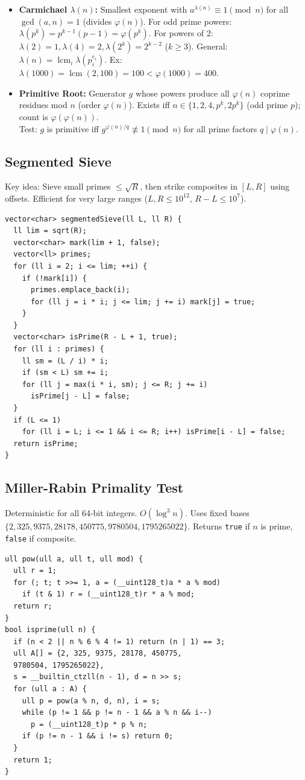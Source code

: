 \begin{itemize}
  $a^{(p-1)/2} \equiv \left(\frac{a}{p}\right) \pmod p$: $+1 \implies a$ is quadratic residue (square mod $p$), $-1 \implies$ non-residue (no square root mod $p$), $0 \implies p \mid a$.
  \item \textbf{Carmichael $\lambda(n)$:} Smallest exponent with $a^{\lambda(n)} \equiv 1 \pmod n$ for all $\gcd(a,n)=1$ (divides $\varphi(n)$). For odd prime powers: $\lambda(p^k) = p^{k-1}(p-1) = \varphi(p^k)$. For powers of 2: $\lambda(2)=1, \lambda(4)=2, \lambda(2^k)=2^{k-2}$ ($k \ge 3$). General: $\lambda(n) = \operatorname{lcm}_i \lambda(p_i^{e_i})$. Ex: $\lambda(1000) = \operatorname{lcm}(2, 100) = 100 < \varphi(1000)=400$.
  \item \textbf{Primitive Root:} Generator $g$ whose powers produce all $\varphi(n)$ coprime residues mod $n$ (order $\varphi(n)$). Exists iff $n \in \{1, 2, 4, p^k, 2p^k\}$ (odd prime $p$); count is $\varphi(\varphi(n))$. \\
  Test: $g$ is primitive iff $g^{\varphi(n)/q} \not\equiv 1 \pmod n$ for all prime factors $q \mid \varphi(n)$.
\end{itemize}
\subsection{Segmented Sieve}
Key idea: Sieve small primes $\le \sqrt{R}$, then strike composites in $[L,R]$ using offsets. Efficient for very large ranges ($L,R \le 10^{12}$, $R-L \le 10^7$).
\begin{verbatim}
vector<char> segmentedSieve(ll L, ll R) {
  ll lim = sqrt(R);
  vector<char> mark(lim + 1, false);
  vector<ll> primes;
  for (ll i = 2; i <= lim; ++i) {
    if (!mark[i]) {
      primes.emplace_back(i);
      for (ll j = i * i; j <= lim; j += i) mark[j] = true;
    }
  }
  vector<char> isPrime(R - L + 1, true);
  for (ll i : primes) {
    ll sm = (L / i) * i;
    if (sm < L) sm += i;
    for (ll j = max(i * i, sm); j <= R; j += i)
      isPrime[j - L] = false;
  }
  if (L <= 1)
    for (ll i = L; i <= 1 && i <= R; i++) isPrime[i - L] = false;
  return isPrime;
}
\end{verbatim}
\subsection{Miller-Rabin Primality Test}
Deterministic for all 64-bit integers. $O(\log^3 n)$. Uses fixed bases $\{2, 325, 9375, 28178, 450775, 9780504, 1795265022\}$. Returns \texttt{true} if $n$ is prime, \texttt{false} if composite.
\begin{verbatim}
ull pow(ull a, ull t, ull mod) {
  ull r = 1;
  for (; t; t >>= 1, a = (__uint128_t)a * a % mod)
    if (t & 1) r = (__uint128_t)r * a % mod;
  return r;
}
bool isprime(ull n) {
  if (n < 2 || n % 6 % 4 != 1) return (n | 1) == 3;
  ull A[] = {2, 325, 9375, 28178, 450775,
  9780504, 1795265022},
  s = __builtin_ctzll(n - 1), d = n >> s;
  for (ull a : A) {
    ull p = pow(a % n, d, n), i = s;
    while (p != 1 && p != n - 1 && a % n && i--)
      p = (__uint128_t)p * p % n;
    if (p != n - 1 && i != s) return 0;
  }
  return 1;
}
\end{verbatim}
